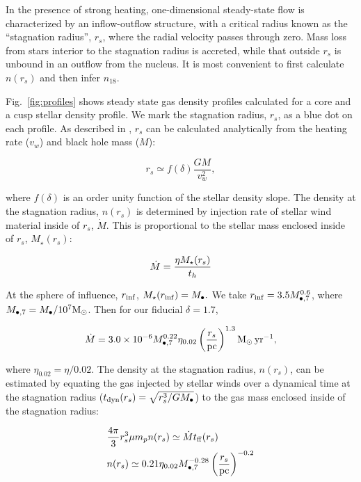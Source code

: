 \documentclass[usenatbib,fleqn]{mnras}
\newcommand{\Mbh}[1][]{M_{\bullet#1}}
\newcommand{\Msun}{{\rm M_\odot}}
\newcommand{\rs}{r_s}
\begin{document}
In the presence of strong heating, one-dimensional steady-state flow
is characterized by an inflow-outflow structure, with a critical
radius known as the ``stagnation radius'', $\rs$, where the radial
velocity passes through zero.  Mass loss from stars interior to the
stagnation radius is accreted, while that outside $\rs$ is unbound in
an outflow from the nucleus.  It is most convenient to
first calculate $n(\rs)$ and then infer $n_{18}$. 

Fig.~\ref{fig:profiles} shows steady state gas density profiles
calculated for a core and a cusp stellar density profile. We mark the
stagnation radius, $r_s$, as a blue dot on each profile. As described
in \citet{Generozov+2015}, $r_s$ can be calculated analytically from the
heating rate ($v_w$) and black hole mass ($M$):

\begin{equation}
r_s \simeq f(\delta) \frac{G M}{v_w^2},
\label{eq:rs}
\end{equation}


where $f(\delta)$ is an order unity function of the stellar density slope.
The density at the stagnation radius, $n(\rs)$ is determined by
injection rate of stellar wind material inside of $\rs$,
$\dot{M}$. This is proportional to the stellar mass enclosed inside of
$\rs$, $M_{\star}(\rs)$:

\begin{equation}
\dot{M}=\frac{\eta M_{\rm \star}(\rs)}{t_h}
\label{eq:dotM}
\end{equation}

At the sphere of influence, $r_{\rm inf}$, $M_{\star}(r_{\rm
  inf})=\Mbh.$ We take $r_{\rm inf}=3.5 \Mbh[,7]^{0.6}$, where
$\Mbh[,7]=\Mbh/10^7 \Msun$. Then for our
fiducial $\delta=1.7$,

\begin{equation}
\dot{M}= 3.0 \times 10^{-6} \Mbh[,7]^{0.22} \eta_{0.02} \left(\frac{r_s}{\rm
  pc}\right)^{1.3} \Msun \, {\rm yr}^{-1},
\end{equation}


where $\eta_{0.02}=\eta/0.02$. The density at the stagnation radius,
$n(\rs)$, can be estimated by equating the gas injected by stellar
winds over a dynamical time at the stagnation radius ($t_{\rm dyn}
(\rs)=\sqrt{\rs^3/G \Mbh}$) to the gas mass enclosed inside of the stagnation radius:

\begin{align}
  &\frac{4 \pi}{3} \rs^3 \mu m_p n(r_s) \simeq \dot{M} t_{\rm ff}
  (\rs) \nonumber\\
  &n(r_s) \simeq 0.21 \eta_{0.02} \Mbh[,7]^{-0.28} \left(\frac{r_s}{\rm
      pc}\right)^{-0.2}
\label{eq:nrs}
\end{align}
 
\end{document}
